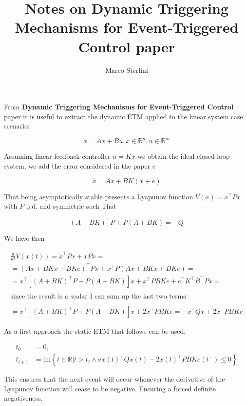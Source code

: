 \documentclass[12pt]{article}
\begin{document}
\date{}
\author{Marco Sterlini}

\title{Notes on Dynamic Triggering Mechanisms for Event-Triggered Control paper}

\maketitle

From \textbf{Dynamic Triggering Mechanisms for Event-Triggered Control} paper it is useful to extract the  dynamic ETM applied to the linear system case scenario:

$$
  \dot{x} = Ax + Bu, x \in \mathbb{R}^{n}, u \in \mathbb{R}^{m} 
$$

Assuming linear feedback controller $u = K x$ we obtain the ideal closed-loop system, we add the error considered in the paper e

$$
  \dot{x} = Ax + BK(x + e)
$$

That being asymptotically stable presents a Lyapunov function $V(x) = x^{\top} P x$ with $P$ p.d. and symmetric such That

$$
  (A + BK)^{\top}P + P(A + BK) = -Q
$$

We have then

\begin{multline*}
  \frac{d}{dt} V(x(t)) = \dot{x}^{\top} P x + x P \dot{x} = \\ 
  = (Ax + BKx + BKe)^{\top} P x + x^{\top} P (Ax + BKx + BKe) = \\
  = x^{\top} \left[ (A + BK)^{\top} P + P (A + BK) \right] x + x^{\top} P BKe + e^{\top} K^{\top} B^{\top} P x = \\
  \\
  \text{since the result is a scalar I can sum up the last two terms} \\
  \\
  = x^{\top} \left[ (A + BK)^{\top} P + P (A + BK) \right] x + 2 x^{\top} P B K e = - x^{\top} Q x + 2 x^{\top} P B K e
\end{multline*}

As a first approach the static ETM that follows can be used:

\begin{align} \label{static}
  t_0 &= 0, \nonumber \\
  t_{i+1} &= \text{inf} \left\{
  t \in \mathbb{R} | t > t_i \wedge \sigma x(t)^{\top} Q x(t) - 2 x(t)^{\top} P B K e(t^{-} ) \leq 0
  \right\}
\end{align}

This ensures that the next event will occur whenever the derivative of the Lyapunov function will cease to be negative. Ensuring a forced definite negativeness. 
\end{document}
